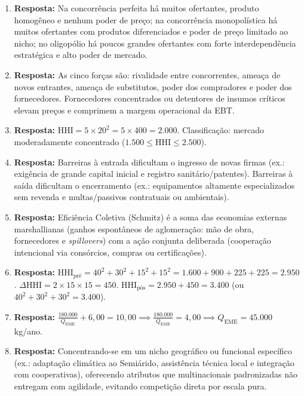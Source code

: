 \begin{boxGabarito}
\begin{enumerate}[leftmargin=1.6em, itemsep=4pt]
  \item \textbf{Resposta:} Na concorrência perfeita há muitos ofertantes, produto homogêneo e nenhum poder de preço; na concorrência monopolística há muitos ofertantes com produtos diferenciados e poder de preço limitado ao nicho; no oligopólio há poucos grandes ofertantes com forte interdependência estratégica e alto poder de mercado.
  \item \textbf{Resposta:} As cinco forças são: rivalidade entre concorrentes, ameaça de novos entrantes, ameaça de substitutos, poder dos compradores e poder dos fornecedores. Fornecedores concentrados ou detentores de insumos críticos elevam preços e comprimem a margem operacional da EBT.
  \item \textbf{Resposta:} $\text{HHI} = 5 \times 20^2 = 5 \times 400 = 2.000$. Classificação: mercado moderadamente concentrado ($1.500 \le \text{HHI} \le 2.500$).
  \item \textbf{Resposta:} Barreiras à entrada dificultam o ingresso de novas firmas (ex.: exigência de grande capital inicial e registro sanitário/patentes). Barreiras à saída dificultam o encerramento (ex.: equipamentos altamente especializados sem revenda e multas/passivos contratuais ou ambientais).
  \item \textbf{Resposta:} Eficiência Coletiva (Schmitz) é a soma das economias externas marshallianas (ganhos espontâneos de aglomeração: mão de obra, fornecedores e \textit{spillovers}) com a ação conjunta deliberada (cooperação intencional via consórcios, compras ou certificações).
  \item \textbf{Resposta:} $\text{HHI}_{\text{pré}} = 40^2 + 30^2 + 15^2 + 15^2 = 1.600 + 900 + 225 + 225 = 2.950$. $\Delta \text{HHI} = 2 \times 15 \times 15 = 450$. $\text{HHI}_{\text{pós}} = 2.950 + 450 = 3.400$ (ou $40^2 + 30^2 + 30^2 = 3.400$).
  \item \textbf{Resposta:} $\frac{180.000}{Q_{\text{EME}}} + 6{,}00 = 10{,}00 \implies \frac{180.000}{Q_{\text{EME}}} = 4{,}00 \implies Q_{\text{EME}} = 45.000$ kg/ano.
  \item \textbf{Resposta:} Concentrando-se em um nicho geográfico ou funcional específico (ex.: adaptação climática ao Semiárido, assistência técnica local e integração com cooperativas), oferecendo atributos que multinacionais padronizadas não entregam com agilidade, evitando competição direta por escala pura.

\end{enumerate}
\end{boxGabarito}
